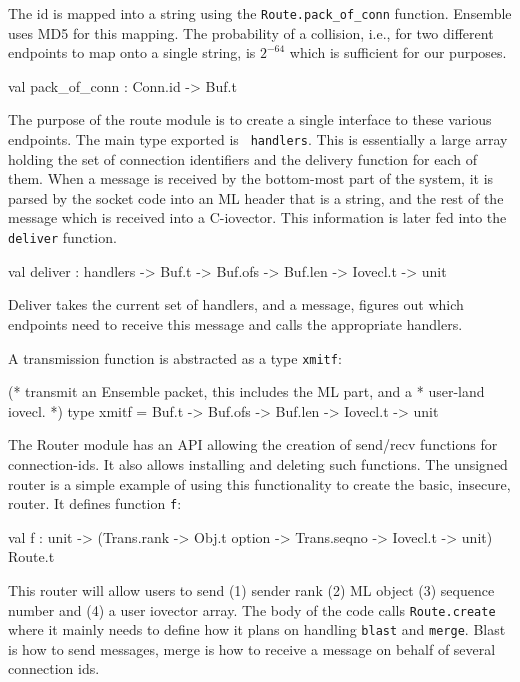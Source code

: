 The id is mapped into a string using the {\tt Route.pack\_of\_conn}
function. Ensemble uses MD5 for this mapping. The probability of a
collision, i.e., for two different endpoints to map onto a single
string, is $2^{-64}$ which is sufficient for our purposes. 

\begin{codebox}
val pack_of_conn : Conn.id -> Buf.t
\end{codebox}

The purpose of the route module is to create a single interface to
these various endpoints. The main type exported is {\tt
handlers}. This is essentially a large array holding the set of
connection identifiers and the delivery function for each of
them. When a message is received by the bottom-most part of the
system, it is parsed by the socket code into an ML header that is a
string, and the rest of the message which is received into a
C-iovector. This information is later fed into the {\tt deliver}
function.

\begin{codebox}
val deliver : handlers -> Buf.t -> Buf.ofs -> Buf.len -> Iovecl.t -> unit
\end{codebox}

Deliver takes the current set of handlers, and a message, figures out
which endpoints need to receive this message and calls the appropriate
handlers. 

A transmission function is abstracted as a type {\tt xmitf}:
\begin{codebox}
(* transmit an Ensemble packet, this includes the ML part, and a
 * user-land iovecl.
 *)
type xmitf = Buf.t -> Buf.ofs -> Buf.len -> Iovecl.t -> unit
\end{codebox}

The Router module has an API allowing the creation of send/recv
functions for connection-ids. It also allows installing and deleting
such functions. The unsigned router is a simple example of
using this functionality to create the basic, insecure,
router. It defines function {\tt f}: 
\begin{codebox}
val f : unit -> 
  (Trans.rank -> Obj.t option -> Trans.seqno -> Iovecl.t -> unit) Route.t
\end{codebox}

This router will allow users to send (1) sender rank (2) ML object (3)
sequence number and (4) a user iovector array. The body of the code
calls {\tt Route.create} where it mainly needs to define how it plans
on handling {\tt blast} and {\tt merge}. Blast is how to send
messages, merge is how to receive a message on behalf of several
connection ids. 

